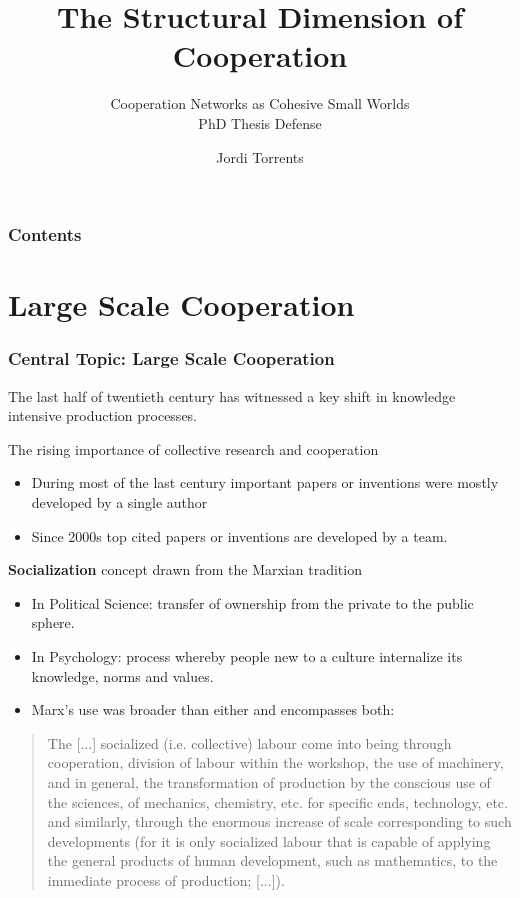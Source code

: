\documentclass[ignorenonframetext,red,8pt,notes=hide]{beamer}
\title{The Structural Dimension of Cooperation}
\subtitle{Cooperation Networks as Cohesive Small Worlds\\PhD Thesis Defense}
\author{Jordi Torrents}
\institute{Department of Sociology\\University of Barcelona}
\begin{document}
\begin{frame}[label=portada]
\maketitle
\end{frame}

\begin{frame}[label=toc]
\frametitle{Contents}
\tableofcontents
\end{frame}

\section{Large Scale Cooperation}

\begin{frame}
\frametitle{Central Topic: Large Scale Cooperation}

The last half of twentieth century has witnessed a key shift in knowledge intensive production processes.

\begin{block}{The rising importance of collective research and cooperation \citep{uzzi:2007a}}
\begin{itemize}
\item During most of the last century important papers or inventions were mostly developed by a single author 
\item Since 2000s top cited papers or inventions are developed by a team.
\end{itemize}
\end{block}

\pause

\begin{block}{\textbf{Socialization} concept drawn from the Marxian tradition \citep{adler:2007}}
\begin{itemize}
\item In Political Science: transfer of ownership from the private to the public sphere.
\item In Psychology: process whereby people new to a culture internalize its knowledge, norms and values.
\item Marx's use was broader than either and encompasses both:
\end{itemize}
\begin{quote}
The [...] socialized (i.e. collective) labour come into being through cooperation, division of labour within the workshop, the use of machinery, and in general, the transformation of production by the conscious use of the sciences, of mechanics, chemistry, etc. for specific ends, technology, etc. and similarly, through the enormous increase of scale corresponding to such developments (for it is only socialized labour that is capable of applying the general products of human development, such as mathematics, to the immediate process of production; [...]). \citep[1024]{marx:1990}
\end{quote}
\end{block}

\end{frame}
\end{document}
